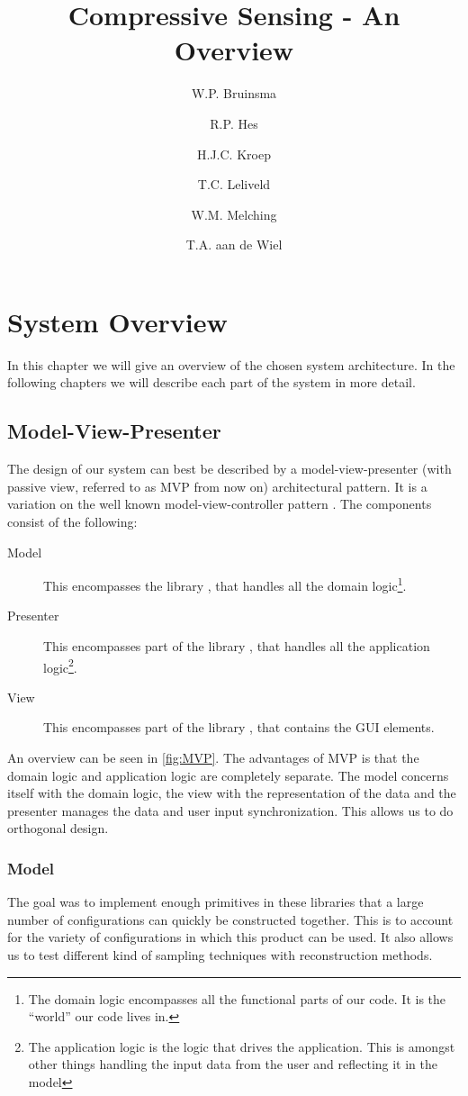 \documentclass[a4paper, openany, oneside]{memoir}
\title{Compressive Sensing - An Overview}
\author{W.P. Bruinsma \and R.P. Hes \and H.J.C. Kroep \and T.C. Leliveld \and W.M. Melching \and T.A. aan de Wiel}
\begin{document}
\chapter{System Overview}
In this chapter we will give an overview of the chosen system architecture. In the following chapters we will describe each part of the system in more detail.

\section{Model-View-Presenter}
\label{sec:model-view-presenter}
The design of our system can best be described by a model-view-presenter (with passive view, referred to as MVP from now on) architectural pattern. It is a variation on the well known model-view-controller pattern \cite{syromiatnikov2014journey}. The components consist of the following:
\begin{description}
    \item[Model] This encompasses the library , that handles all the domain logic\footnote{The domain logic encompasses all the functional parts of our code. It is the ``world'' our code lives in.}.
    \item[Presenter] This encompasses part of the library , that handles all the application logic\footnote{The application logic is the logic that drives the application. This is amongst other things handling the input data from the user and reflecting it in the model}.
    \item[View] This encompasses part of the library , that contains the GUI elements.
\end{description}
An overview can be seen in \cref{fig:MVP}. The advantages of MVP is that the domain logic and application logic are completely separate. The model concerns itself with the domain logic, the view with the representation of the data and the presenter manages the data and user input synchronization. This allows us to do orthogonal design.

\begin{figure*}
    \centering
    
    \caption{Illustration of the MVP pattern as an hierarchical way of separating our system.}
    \label{fig:MVP}
\end{figure*}

\subsection{Model}
\label{sub:model}
The goal was to implement enough primitives in these libraries that a large number of configurations can quickly be constructed together. This is to account for the variety of configurations in which this product can be used. It also allows us to test different kind of sampling techniques with reconstruction methods.
\end{document}
